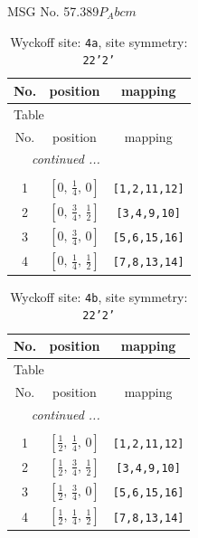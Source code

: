\documentclass[fleqn,8pt]{jsarticle}
\begin{document}
\setcounter{MaxMatrixCols}{32}

\renewcommand{\tablename}{Table~}
\renewcommand{\figurename}{Figure~}
\begin{center}
\LARGE
MSG No. 57.389\quad$P_{A}bcm$
\end{center}
\renewcommand{\arraystretch}{1.2}
\begin{longtable}{ccc}
\caption{Wyckoff site: {\tt 4a}, site symmetry: {\tt 22'2'}}
 \\
 \hline \hline
No. & position & mapping \\ \hline \endfirsthead

\multicolumn{2}{l}{\tablename\ \thetable{}} \\
 \hline \hline
No. & position & mapping \\ \hline \endhead

 \hline \hline
\multicolumn{2}{r}{\footnotesize\it continued ...} \\ \endfoot

 \hline \hline
\multicolumn{2}{r}{} \\ \endlastfoot

1 & $\left[ 0,\, \frac{1}{4},\, 0 \right]$ & {\tt [1,2,11,12]} \\ \hline
2 & $\left[ 0,\, \frac{3}{4},\, \frac{1}{2} \right]$ & {\tt [3,4,9,10]} \\ \hline
3 & $\left[ 0,\, \frac{3}{4},\, 0 \right]$ & {\tt [5,6,15,16]} \\ \hline
4 & $\left[ 0,\, \frac{1}{4},\, \frac{1}{2} \right]$ & {\tt [7,8,13,14]} \\
\end{longtable}
\renewcommand{\arraystretch}{1.2}
\begin{longtable}{ccc}
\caption{Wyckoff site: {\tt 4b}, site symmetry: {\tt 22'2'}}
 \\
 \hline \hline
No. & position & mapping \\ \hline \endfirsthead

\multicolumn{2}{l}{\tablename\ \thetable{}} \\
 \hline \hline
No. & position & mapping \\ \hline \endhead

 \hline \hline
\multicolumn{2}{r}{\footnotesize\it continued ...} \\ \endfoot

 \hline \hline
\multicolumn{2}{r}{} \\ \endlastfoot

1 & $\left[ \frac{1}{2},\, \frac{1}{4},\, 0 \right]$ & {\tt [1,2,11,12]} \\ \hline
2 & $\left[ \frac{1}{2},\, \frac{3}{4},\, \frac{1}{2} \right]$ & {\tt [3,4,9,10]} \\ \hline
3 & $\left[ \frac{1}{2},\, \frac{3}{4},\, 0 \right]$ & {\tt [5,6,15,16]} \\ \hline
4 & $\left[ \frac{1}{2},\, \frac{1}{4},\, \frac{1}{2} \right]$ & {\tt [7,8,13,14]} \\
\end{longtable}
\end{document}
